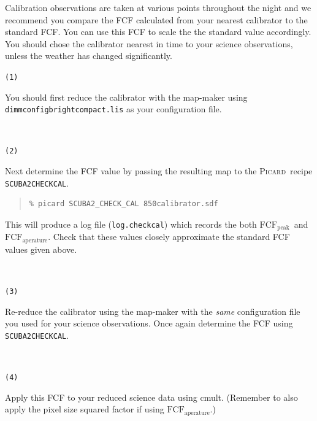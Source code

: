 \documentclass[twoside,11pt]{article}
\newcommand{\xref}[3]{#1}
\renewcommand{\_}{\texttt{\symbol{95}}}
\newenvironment{myquote}{\begin{quote}\begin{small}}{\end{small}\end{quote}}
\newcommand{\fcfb}{$\mathrm{FCF_{peak}}$}
\newcommand{\fcfa}{$\mathrm{FCF_{aperature}}$}
\newcommand{\picard}{\xref{\textsc{Picard}}{sun265}{}}
\newcommand{\drrecipe}[1]{\texttt{#1}}
\newcommand{\task}[1]{\textsf{#1}}
\newcommand{\cmult}{\xref{\task{cmult}}{sun95}{CMULT}}
\begin{document}
Calibration observations are taken at various points throughout the
night and we recommend you compare the FCF calculated from your
nearest calibrator to the standard FCF. You can use this FCF to scale
the the standard value accordingly. You should chose the calibrator
nearest in time to your science observations, unless the weather has
changed significantly.
\vspace{1mm}\\
\begin{minipage}[t]{0.05\linewidth}
\texttt{(1)}
\end{minipage}
\begin{minipage}[t]{0.95\linewidth}
 You should first reduce the calibrator with the map-maker using
 \texttt{dimmconfig\_bright\_compact.lis} as your configuration file.
\end{minipage}
\vspace{1mm}\\
\begin{minipage}[t]{0.05\linewidth}
\texttt{(2)}
\end{minipage}
\begin{minipage}[t]{0.95\linewidth}
Next determine the FCF value by passing the resulting map to the
\picard\ recipe \drrecipe{SCUBA2\_CHECK\_CAL}.
\begin{myquote}
\begin{verbatim}
% picard SCUBA2_CHECK_CAL 850calibrator.sdf
\end{verbatim}
\end{myquote}
This will produce a log file (\texttt{log.checkcal}) which records the both
\fcfb\ and \fcfa. Check that these values closely approximate the
standard FCF values given above.
\end{minipage}
\vspace{1mm}\\
\begin{minipage}[t]{0.05\linewidth}
\texttt{(3)}
\end{minipage}
\begin{minipage}[t]{0.95\linewidth}
Re-reduce the calibrator using the map-maker with the \emph{same}
configuration file you used for your science observations. Once again
determine the FCF using \drrecipe{SCUBA2\_CHECK\_CAL}.
\end{minipage}
\vspace{1mm}\\
\begin{minipage}[t]{0.05\linewidth}
\texttt{(4)}
\end{minipage}
\begin{minipage}[t]{0.95\linewidth}
Apply this FCF to your reduced science data using \cmult. (Remember to
also apply the pixel size squared factor if using \fcfa.)
\end{minipage}
\end{document}
